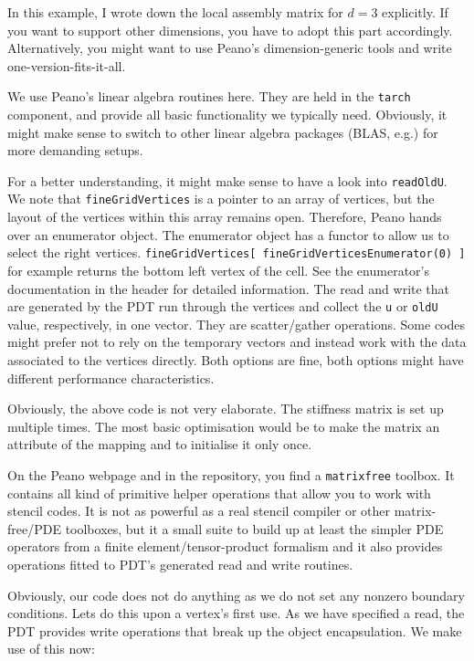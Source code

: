 \noindent
In this example, I wrote down the local assembly matrix for $d=3$ explicitly.
If you want to support other dimensions, you have to adopt this part
accordingly.
Alternatively, you might want to use Peano's dimension-generic tools and write
one-version-fits-it-all.

We use Peano's linear algebra routines here.
They are held in the \texttt{tarch} component, and provide all basic
functionality we typically need.
Obviously, it might make sense to switch to other linear algebra packages
(BLAS, e.g.) for more demanding setups.

For a better understanding, it might make sense to have a look into
\texttt{readOldU}.
We note that \texttt{fineGridVertices} is a pointer to an array of vertices, but
the layout of the vertices within this array remains open.
Therefore, Peano hands over an enumerator object. 
The enumerator object has a functor to allow us to select the right vertices.
\texttt{fineGridVertices[ fineGridVerticesEnumerator(0) ]} for example returns
the bottom left vertex of the cell.
See the enumerator's documentation in the header for detailed information.
The read and write that are generated by the PDT run through the vertices and
collect the \texttt{u} or \texttt{oldU} value, respectively, in one vector.
They are scatter/gather operations.
Some codes might prefer not to rely on the temporary vectors and instead work
with the data associated to the vertices directly.
Both options are fine, both options might have different performance
characteristics.

 
Obviously, the above code is not very elaborate. 
The stiffness matrix is set up multiple times.
The most basic optimisation would be to make the matrix an attribute of the
mapping and to initialise it only once.

\begin{remark}
  On the Peano webpage and in the repository, you find a \texttt{matrixfree}
  toolbox. It contains all kind of primitive helper operations that allow you to
  work with stencil codes. It is not as powerful as a real stencil compiler or 
  other matrix-free/PDE toolboxes, but it a small suite to build up at least the
  simpler PDE operators from a finite element/tensor-product formalism and it
  also provides operations fitted to PDT's generated read and write routines. 
\end{remark}


\noindent
Obviously, our code does not do anything as we do not set any nonzero boundary
conditions. 
Lets do this upon a vertex's first use. 
As we have specified a read, the PDT provides write operations that break up the
object encapsulation.
We make use of this now:


